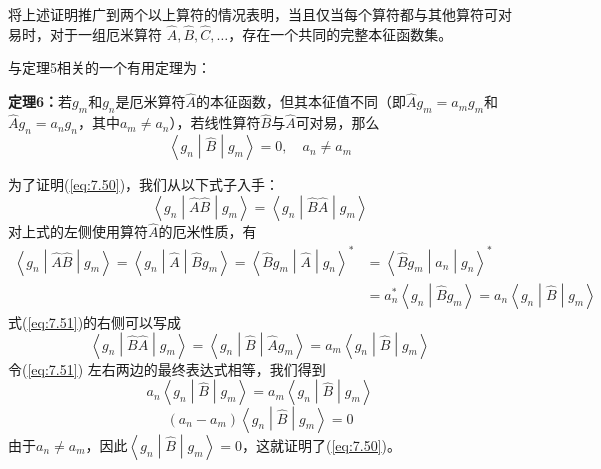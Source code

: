     将上述证明推广到两个以上算符的情况表明，当且仅当每个算符都与其他算符可对易时，对于一组厄米算符 $\hat{A},\hat{B},\hat{C},\ldots$，存在一个共同的完整本征函数集。

    与定理5相关的一个有用定理为：
    \begin{center}
        \centering
        \parbox{0.8\textwidth}{
            \textbf{定理6：}若$g_m$和$g_n$是厄米算符$\hat{A}$的本征函数，但其本征值不同（即$\hat{A}g_m = a_mg_m$和$\hat{A}g_n = a_ng_n$，其中$a_m \neq a_n$），若线性算符$\hat{B}$与$\hat{A}$可对易，那么
            \begin{equation}
                \left\langle g_n \middle| \hat{B} \middle| g_m \right\rangle = 0, \quad a_n \neq a_m
                \label{eq:7.50}
            \end{equation}
        }
    \end{center}

    为了证明(\ref{eq:7.50})，我们从以下式子入手：
    \begin{equation}
        \left\langle g_n \middle| \hat{A}\hat{B} \middle| g_m \right\rangle = \left\langle g_n \middle| \hat{B}\hat{A} \middle| g_m \right\rangle
        \label{eq:7.51}
    \end{equation}
    对上式的左侧使用算符$\hat{A}$的厄米性质，有
    \begin{equation*}
        \begin{aligned}
            \left\langle g_n \middle| \hat{A}\hat{B} \middle| g_m \right\rangle = \left\langle g_n \middle| \hat{A} \middle| \hat{B} g_m \right\rangle = \left\langle \hat{B}g_m \middle| \hat{A} \middle| g_n \right\rangle^{\ast} &= \left\langle \hat{B}g_m \middle| a_n \middle| g_n \right\rangle^{\ast} \\
            &= a_n^{\ast}\left\langle g_n \middle| \hat{B}g_m \right\rangle = a_n\left\langle g_n \middle| \hat{B} \middle| g_m \right\rangle
        \end{aligned}
    \end{equation*}
    式(\ref{eq:7.51})的右侧可以写成
    \begin{equation*}
        \left\langle g_n \middle| \hat{B}\hat{A} \middle| g_m \right\rangle = \left\langle g_n \middle| \hat{B} \middle| \hat{A}g_m \right\rangle = a_m\left\langle g_n \middle| \hat{B} \middle| g_m \right\rangle
    \end{equation*}
    令(\ref{eq:7.51}) 左右两边的最终表达式相等，我们得到
    \begin{equation*}
        a_n \left\langle g_n \middle| \hat{B} \middle| g_m \right\rangle = a_m\left\langle g_n \middle| \hat{B} \middle| g_m \right\rangle
    \end{equation*}
    \begin{equation*}
        \left(a_n - a_m\right)\left\langle g_n \middle| \hat{B} \middle| g_m \right\rangle = 0
    \end{equation*}
    由于$a_n \neq a_m$，因此$\left\langle g_n \middle| \hat{B} \middle| g_m \right\rangle = 0$，这就证明了(\ref{eq:7.50})。

